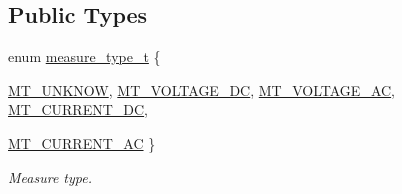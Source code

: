 \subsection*{Public Types}
\begin{DoxyCompactItemize}
\item 
enum \hyperlink{classmdt_frame_codec_scpi_u3606_a_a3d7a1de14d77797a08e3d2991fa9f004}{measure\_\-type\_\-t} \{ \par
\hyperlink{classmdt_frame_codec_scpi_u3606_a_a3d7a1de14d77797a08e3d2991fa9f004a56df4ffec0205d0bae97d56853490eec}{MT\_\-UNKNOW}, 
\hyperlink{classmdt_frame_codec_scpi_u3606_a_a3d7a1de14d77797a08e3d2991fa9f004a7178fed206da47e7f55e68723acf809a}{MT\_\-VOLTAGE\_\-DC}, 
\hyperlink{classmdt_frame_codec_scpi_u3606_a_a3d7a1de14d77797a08e3d2991fa9f004a95fc88c0223637cf3fe3a101fb568f1d}{MT\_\-VOLTAGE\_\-AC}, 
\hyperlink{classmdt_frame_codec_scpi_u3606_a_a3d7a1de14d77797a08e3d2991fa9f004a4b6d05bccb61870ebae4f58c34b41e31}{MT\_\-CURRENT\_\-DC}, 
\par
\hyperlink{classmdt_frame_codec_scpi_u3606_a_a3d7a1de14d77797a08e3d2991fa9f004acecbad4db2f3cb2b92099e2a0f57d3a3}{MT\_\-CURRENT\_\-AC}
 \}
\begin{DoxyCompactList}\small\item\em Measure type. \end{DoxyCompactList}\end{DoxyCompactItemize}
